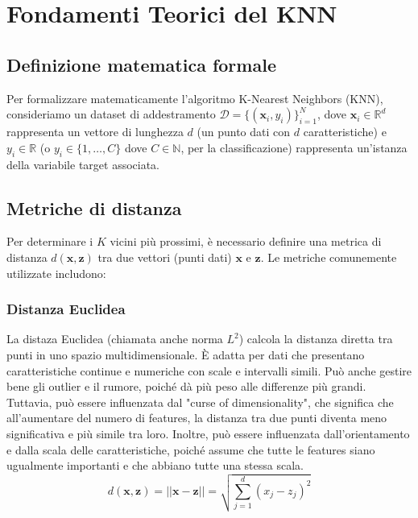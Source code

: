 \section{Fondamenti Teorici del KNN}

\subsection{Definizione matematica formale}

Per formalizzare matematicamente l'algoritmo K-Nearest Neighbors (KNN), 
consideriamo un dataset di addestramento \( \mathcal{D} = \{(\mathbf{x}_i, y_i)\}_{i=1}^N \), 
dove \( \mathbf{x}_i \in \mathbb{R}^d \) rappresenta un vettore di lunghezza \( d \) 
(un punto dati con \( d \) caratteristiche) e \( y_i \in \mathbb{R} \) 
(o \( y_i \in \{1, \ldots, C\} \) dove $C \in \mathbb{N}$, per la classificazione) rappresenta 
un'istanza della variabile target associata.

\subsection{Metriche di distanza}

Per determinare i \( K \) vicini più prossimi, è necessario definire 
una metrica di distanza \( d(\mathbf{x}, \mathbf{z}) \) tra due vettori (punti dati) 
\( \mathbf{x} \) e \( \mathbf{z} \). Le metriche comunemente utilizzate includono:

\subsubsection{Distanza Euclidea} 
La distaza Euclidea (chiamata anche norma $L^2$) calcola la distanza diretta tra punti in uno spazio multidimensionale. È adatta per dati 
che presentano caratteristiche continue e numeriche con scale e intervalli simili. 
Può anche gestire bene gli outlier e il rumore, poiché dà più peso alle differenze più grandi. 
Tuttavia, può essere influenzata dal "curse of dimensionality", che significa che all'aumentare 
del numero di features, la distanza tra due punti diventa meno significativa e più simile tra loro.
Inoltre, può essere influenzata dall'orientamento e dalla scala delle 
    caratteristiche, poiché assume che tutte le features siano ugualmente 
    importanti e che abbiano tutte una stessa scala.
    \[
    d(\mathbf{x}, \mathbf{z}) = ||\mathbf{x} - \mathbf{z}|| = \sqrt{\sum_{j=1}^d (x_j - z_j)^2}
    \]

